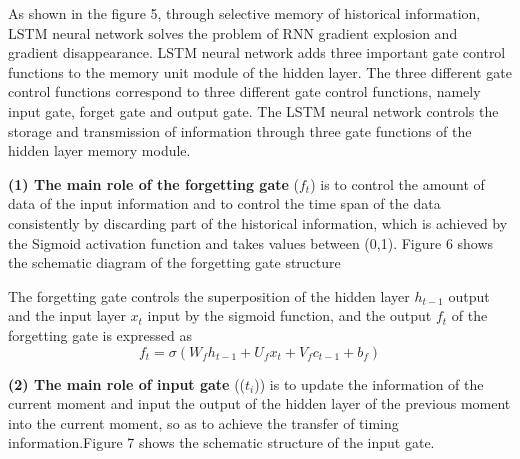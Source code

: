\documentclass{mcmthesis}
\begin{document}
As shown in the figure 5, through selective memory of historical information, LSTM neural network solves the problem of RNN gradient explosion and gradient disappearance. LSTM neural network adds three important gate control functions to the memory unit module of the hidden layer. The three different gate control functions correspond to three different gate control functions, namely input gate, forget gate and output gate. The LSTM neural network controls the storage and transmission of information through three gate functions of the hidden layer memory module.

\textbf{(1) The main role of the forgetting gate} ($ f_t $) is to control the amount of data of the input information and to control the time span of the data consistently by discarding part of the historical information, which is achieved by the Sigmoid activation function and takes values between (0,1). Figure 6 shows the schematic diagram of the forgetting gate structure

The forgetting gate controls the superposition of the hidden layer $ h_{t-1} $ output and the input layer $ x_t $ input by the sigmoid function, and the output $ f_t $ of the forgetting gate is expressed as
\begin{equation}
	f_t=\sigma(W_fh_{t-1}+U_fx_t+V_fc_{t-1}+b_f)
\end{equation}

\textbf{(2) The main role of input gate} (($ t_i $)) is to update the information of the current moment and input the output of the hidden layer of the previous moment into the current moment, so as to achieve the transfer of timing information.Figure 7 shows the schematic structure of the input gate.
\end{document}
